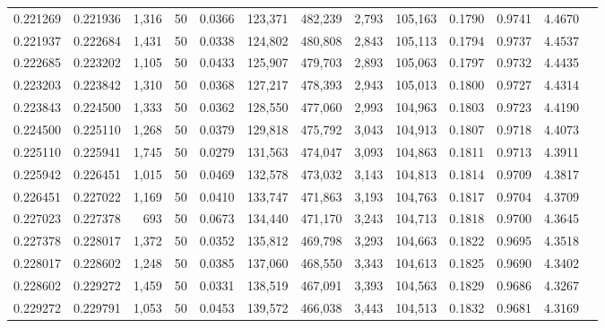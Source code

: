 \begin{tabular}{rrrrrrrrrrrrr}
0.221269 & 0.221936 & 1,316 &  50 &                                     0.0366 & 123,371 & 482,239 &   2,793 & 105,163 & 0.1790 & 0.9741 & 4.4670 \\
0.221937 & 0.222684 & 1,431 &  50 &                                     0.0338 & 124,802 & 480,808 &   2,843 & 105,113 & 0.1794 & 0.9737 & 4.4537 \\
0.222685 & 0.223202 & 1,105 &  50 &                                     0.0433 & 125,907 & 479,703 &   2,893 & 105,063 & 0.1797 & 0.9732 & 4.4435 \\
0.223203 & 0.223842 & 1,310 &  50 &                                     0.0368 & 127,217 & 478,393 &   2,943 & 105,013 & 0.1800 & 0.9727 & 4.4314 \\
0.223843 & 0.224500 & 1,333 &  50 &                                     0.0362 & 128,550 & 477,060 &   2,993 & 104,963 & 0.1803 & 0.9723 & 4.4190 \\
0.224500 & 0.225110 & 1,268 &  50 &                                     0.0379 & 129,818 & 475,792 &   3,043 & 104,913 & 0.1807 & 0.9718 & 4.4073 \\
0.225110 & 0.225941 & 1,745 &  50 &                                     0.0279 & 131,563 & 474,047 &   3,093 & 104,863 & 0.1811 & 0.9713 & 4.3911 \\
0.225942 & 0.226451 & 1,015 &  50 &                                     0.0469 & 132,578 & 473,032 &   3,143 & 104,813 & 0.1814 & 0.9709 & 4.3817 \\
0.226451 & 0.227022 & 1,169 &  50 &                                     0.0410 & 133,747 & 471,863 &   3,193 & 104,763 & 0.1817 & 0.9704 & 4.3709 \\
0.227023 & 0.227378 &   693 &  50 &                                     0.0673 & 134,440 & 471,170 &   3,243 & 104,713 & 0.1818 & 0.9700 & 4.3645 \\
0.227378 & 0.228017 & 1,372 &  50 &                                     0.0352 & 135,812 & 469,798 &   3,293 & 104,663 & 0.1822 & 0.9695 & 4.3518 \\
0.228017 & 0.228602 & 1,248 &  50 &                                     0.0385 & 137,060 & 468,550 &   3,343 & 104,613 & 0.1825 & 0.9690 & 4.3402 \\
0.228602 & 0.229272 & 1,459 &  50 &                                     0.0331 & 138,519 & 467,091 &   3,393 & 104,563 & 0.1829 & 0.9686 & 4.3267 \\
0.229272 & 0.229791 & 1,053 &  50 &                                     0.0453 & 139,572 & 466,038 &   3,443 & 104,513 & 0.1832 & 0.9681 & 4.3169 \\

\end{tabular}
